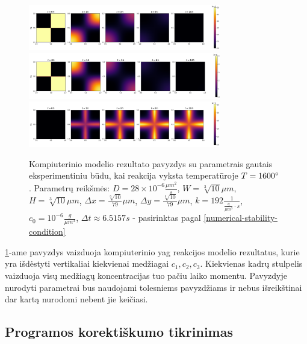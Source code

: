 \begin{figure}[h!]
\centering
\includegraphics[width=0.75\textwidth]{../paper/assets/example-0.png} \\ 
\includegraphics[width=0.75\textwidth]{../paper/assets/example-1.png} \\
\includegraphics[width=0.75\textwidth]{../paper/assets/example-2.png}

\caption{Kompiuterinio modelio rezultato pavyzdys su parametrais gautais eksperimentiniu būdu, kai reakcija vyksta temperatūroje $T=1600\degree$ \cite{mackeviciusCloserLookComputer2012}. Parametrų reikšmės: $D = 28\times 10^{-6} \frac{\mu m^2}{s}$, $W = \sqrt[3]{10}\mu m$, $H = \sqrt[3]{10}\mu m$, $\Delta x = \frac{\sqrt[3]{10}}{79}\mu m$, $\Delta y = \frac{\sqrt[3]{10}}{79} \mu m$, $k = 192 \frac{1}{ \frac{g}{\mu m^3}\cdot s}$, $c_0 = 10^{-6} \frac{g}{\mu m^3}$, $\Delta t \approx 6.5157s$ - pasirinktas pagal \eqref{numerical-stability-condition} }

\label{result-example}
\end{figure}

\ref{result-example}-ame pavyzdys vaizduoja kompiuterinio \acs{yag} reakcijos modelio rezultatus, kurie yra išdėstyti vertikaliai kiekvienai medžiagai $c_1, c_2, c_3$. Kiekvienas kadrų stulpelis vaizduoja visų medžiagų koncentracijas tuo pačiu laiko momentu. Pavyzdyje nurodyti parametrai bus naudojami tolesniems pavyzdžiams ir nebus išreikštinai dar kartą nurodomi nebent jie keičiasi.

\subsection{Programos korektiškumo tikrinimas}


